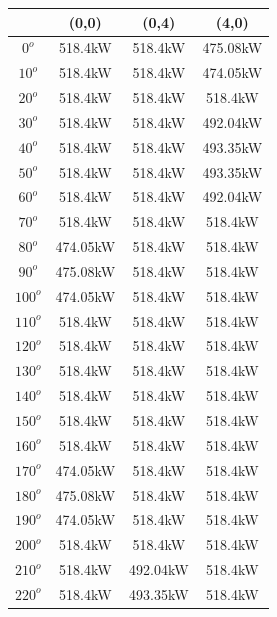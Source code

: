         \singlespacing
        \begin{table}[H]
            \centering
            \begin{tabular}{|c|c|c|c|} \hline
                 & (0,0) & (0,4) & (4,0)\\ \hline
                $0^o$   & 518.4kW & 518.4kW & 475.08kW \\ \hline
                $10^o$  & 518.4kW & 518.4kW & 474.05kW \\ \hline
                $20^o$  & 518.4kW & 518.4kW & 518.4kW \\ \hline
                $30^o$  & 518.4kW & 518.4kW & 492.04kW \\ \hline
                $40^o$  & 518.4kW & 518.4kW & 493.35kW \\ \hline
                $50^o$  & 518.4kW & 518.4kW & 493.35kW \\ \hline
                $60^o$  & 518.4kW & 518.4kW & 492.04kW \\ \hline
                $70^o$  & 518.4kW & 518.4kW & 518.4kW \\ \hline
                $80^o$  & 474.05kW & 518.4kW & 518.4kW \\ \hline
                $90^o$  & 475.08kW & 518.4kW & 518.4kW \\ \hline
                $100^o$ & 474.05kW & 518.4kW & 518.4kW \\ \hline
                $110^o$ & 518.4kW & 518.4kW & 518.4kW \\ \hline
                $120^o$ & 518.4kW & 518.4kW & 518.4kW \\ \hline
                $130^o$ & 518.4kW & 518.4kW & 518.4kW \\ \hline
                $140^o$ & 518.4kW & 518.4kW & 518.4kW \\ \hline
                $150^o$ & 518.4kW & 518.4kW & 518.4kW \\ \hline
                $160^o$ & 518.4kW & 518.4kW & 518.4kW \\ \hline
                $170^o$ & 474.05kW & 518.4kW & 518.4kW \\ \hline
                $180^o$ & 475.08kW & 518.4kW & 518.4kW \\ \hline
                $190^o$ & 474.05kW & 518.4kW & 518.4kW \\ \hline
                $200^o$ & 518.4kW & 518.4kW & 518.4kW \\ \hline
                $210^o$ & 518.4kW & 492.04kW & 518.4kW \\ \hline
                $220^o$ & 518.4kW & 493.35kW & 518.4kW \\ \hline

\end{tabular}
\end{table}
